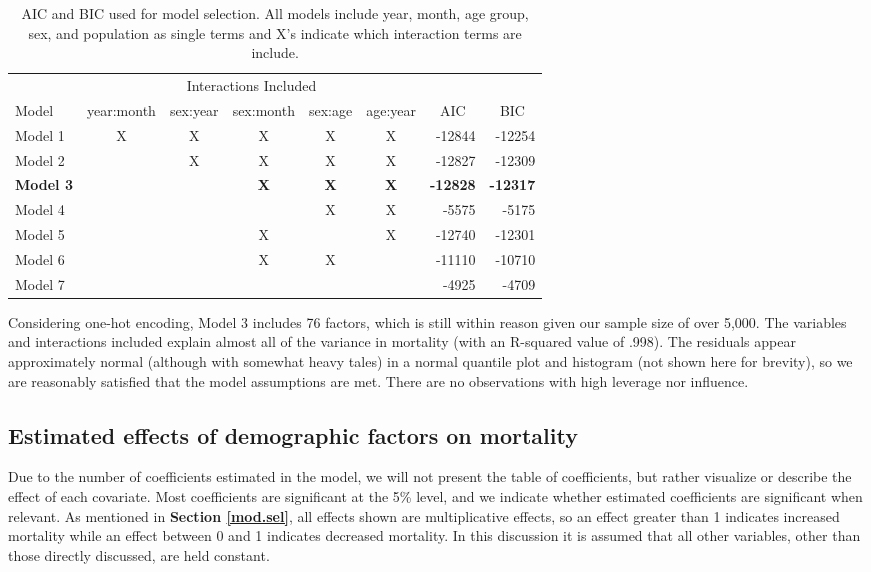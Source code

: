 \documentclass[letterpaper, 11pt]{article}
\begin{document}
\begin{table}[t]
\centering
\begingroup\tabcolsep=0.11cm\small
\begin{tabular}{lcccccrr}
 & \multicolumn{5}{c}{Interactions Included} & \multicolumn{2}{l}{} \\ \cline{2-6}
  Model & year:month & sex:year & sex:month & sex:age & age:year & \multicolumn{1}{c}{AIC} & \multicolumn{1}{c}{BIC} \\
  \hline
Model 1 & X & X & X & X & X & -12844 & -12254 \\
  Model 2 &  & X & X & X & X & -12827 & -12309 \\
  \textbf{Model 3} &  &  & \textbf{X }& \textbf{X }& \textbf{X} & \textbf{-12828} & \textbf{-12317} \\
Model 4 &  &  &  & X & X & -5575 & -5175 \\
  Model 5 &  &  & X &  & X & -12740 & -12301 \\
  Model 6 &  &  & X & X &  & -11110 & -10710 \\
   \hline
Model 7 &  &  &  &  &  & -4925 & -4709 \\
   \hline
\end{tabular}
\endgroup
\caption{AIC and BIC used for model selection. All models include year, month, age group, sex, and population as single terms and X's indicate which interaction terms are include.}
\label{tab:aic-bic}
\end{table}

Considering one-hot encoding, Model 3 includes 76 factors, which is still within reason given our sample size of over 5,000. The variables and interactions included explain almost all of the variance in mortality (with an R-squared value of .998). The residuals appear approximately normal (although with somewhat heavy tales) in a normal quantile plot and histogram (not shown here for brevity), so we are reasonably satisfied that the model assumptions are met. There are no observations with high leverage nor influence.

\subsection{Estimated effects of demographic factors on mortality}\label{ests}

Due to the number of coefficients estimated in the model, we will not present the table of coefficients, but rather visualize or describe the effect of each covariate. Most coefficients are significant at the 5\% level, and we indicate whether estimated coefficients are significant when relevant. As mentioned in \textbf{Section \ref{mod.sel}}, all effects shown are multiplicative effects, so an effect greater than 1 indicates increased mortality while an effect between 0 and 1 indicates decreased mortality. In this discussion it is assumed that all other variables, other than those directly discussed, are held constant.
\end{document}
